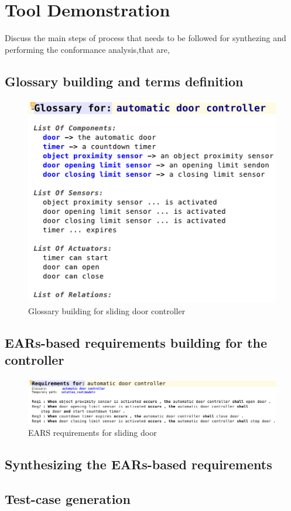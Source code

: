 \section{Tool Demonstration}
\label{sec:demo}

Discuss the main steps of process that needs to be followed for synthezing
and performing the conformance analysis,that are, 

\subsection{Glossary building and terms definition}

\begin{figure}[!h]
\centering
\includegraphics[width=1\textwidth]{./images/glossary.png}
\caption{Glossary building for sliding door controller}
\label{fig:glossary_def}
\end{figure}

\subsection{EARs-based requirements building for the controller}

\begin{figure}[!h]
\centering
\includegraphics[width=1\textwidth]{./images/EARS-Reqs.png}
\caption{EARS requirements for sliding door}
\label{fig:EARS_req}
\end{figure}

\subsection{Synthesizing the EARs-based requirements}
\subsection{Test-case generation}